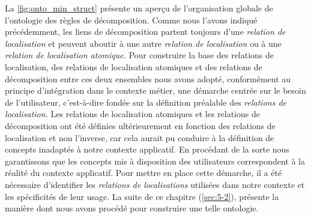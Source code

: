 La \autoref{fig:onto_min_struct} présente un aperçu de l'organisation
globale de l'ontologie des règles de décomposition. Comme nous l'avons
indiqué précédemment, les liens de décomposition partent toujours
d'une \emph{relation de localisation} et peuvent aboutir à une autre
\emph{relation de localisation} ou à une \emph{relation de
  localisation atomique.} Pour construire la base des relations de
localisation, des relations de localisation atomiques et des relations
de décomposition entre ces deux ensembles nous avons adopté,
conformément au principe d'intégration dans le contexte métier, une
démarche centrée sur le besoin de l'utilisateur, c'est-à-dire fondée
sur la définition préalable des \emph{relations de localisation.} Les
relations de localisation atomiques et les relations de décomposition
ont été définies ultérieurement en fonction des relations de
localisation et non l'inverse, car cela aurait pu conduire à la
définition de concepts inadaptés à notre contexte applicatif. En
procédant de la sorte nous garantissons que les concepts mis à
disposition des utilisateurs correspondent à la réalité du contexte
applicatif. Pour mettre en place cette démarche, il a été nécessaire
d'identifier les \emph{relations de localisations} utilisées dans
notre contexte et les spécificités de leur usage. La suite de ce
chapitre (\autoref{sec:5-2}), présente la manière dont nous avons
procédé pour construire une telle ontologie.


